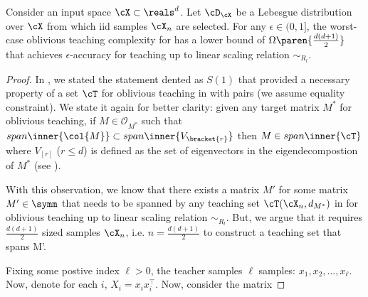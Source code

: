\begin{lemma}
       Consider an input space $\cX \subset \reals^d$. Let $\cD_{\cX}$ be a Lebesgue distribution over $\cX$ from which iid samples $\cX_n$ are selected. For any $\epsilon \in (0,1]$, the worst-case oblivious teaching complexity for  has a lower bound of $\Omega\paren{\frac{d(d+1)}{2}}$ that achieves $\epsilon$-accuracy for teaching up to linear scaling relation $\sim_{R_l}$.
\end{lemma}
\begin{proof}
    In , we stated the statement dented as $S(1)$ that provided a necessary property of a set $\cT$ for oblivious teaching in  with pairs (we assume equality constraint). We state it again for better clarity: given any target matrix $M^*$ for oblivious teaching, if $M \in \mathcal{O}_{M^*}$ such that $span\inner{\col{M}} \subset span\inner{V_{\bracket{r}}}$ then $M \in span \inner{\cT}$ where $V_{[r]}$ ($r \le d$) is defined as the set of eigenvectors in the eigendecompostion of $M^*$ (see ). 
    
    With this observation, we know that there exists a matrix $M'$ for some matrix $M' \in \symm$ that needs to be spanned by any teaching set $\cT(\cX_n, d_{M^*})$ in  for oblivious teaching up to linear scaling relation $\sim_{R_l}$. But, we argue that it requires $\frac{d(d+1)}{2}$ sized samples $\cX_n$, i.e. $n = \frac{d(d+1)}{2}$ to construct a teaching set that spans M'.

    Fixing some postive index $\ell > 0$, the teacher samples $\ell$ samples: $x_1,x_2,\ldots, x_{\ell}$. Now, denote for each $i$, $X_i = x_ix_i^{\top}$. Now, consider the matrix


\end{proof}
